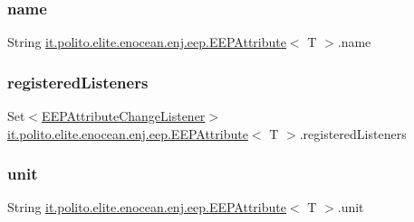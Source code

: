 \subsubsection{\texorpdfstring{name}{name}}
{\footnotesize\ttfamily String \hyperlink{classit_1_1polito_1_1elite_1_1enocean_1_1enj_1_1eep_1_1_e_e_p_attribute}{it.\+polito.\+elite.\+enocean.\+enj.\+eep.\+E\+E\+P\+Attribute}$<$ T $>$.name\hspace{0.3cm}{\ttfamily [protected]}}

\hypertarget{classit_1_1polito_1_1elite_1_1enocean_1_1enj_1_1eep_1_1_e_e_p_attribute_a4e719778053ed153c1382569278b7bd7}{}\label{classit_1_1polito_1_1elite_1_1enocean_1_1enj_1_1eep_1_1_e_e_p_attribute_a4e719778053ed153c1382569278b7bd7} 
\subsubsection{\texorpdfstring{registered\+Listeners}{registeredListeners}}
{\footnotesize\ttfamily Set$<$\hyperlink{interfaceit_1_1polito_1_1elite_1_1enocean_1_1enj_1_1eep_1_1_e_e_p_attribute_change_listener}{E\+E\+P\+Attribute\+Change\+Listener}$>$ \hyperlink{classit_1_1polito_1_1elite_1_1enocean_1_1enj_1_1eep_1_1_e_e_p_attribute}{it.\+polito.\+elite.\+enocean.\+enj.\+eep.\+E\+E\+P\+Attribute}$<$ T $>$.registered\+Listeners\hspace{0.3cm}{\ttfamily [protected]}}

\hypertarget{classit_1_1polito_1_1elite_1_1enocean_1_1enj_1_1eep_1_1_e_e_p_attribute_a3fe5b3d613c30066354ad66eeb23b8ae}{}\label{classit_1_1polito_1_1elite_1_1enocean_1_1enj_1_1eep_1_1_e_e_p_attribute_a3fe5b3d613c30066354ad66eeb23b8ae} 
\subsubsection{\texorpdfstring{unit}{unit}}
{\footnotesize\ttfamily String \hyperlink{classit_1_1polito_1_1elite_1_1enocean_1_1enj_1_1eep_1_1_e_e_p_attribute}{it.\+polito.\+elite.\+enocean.\+enj.\+eep.\+E\+E\+P\+Attribute}$<$ T $>$.unit\hspace{0.3cm}{\ttfamily [protected]}}

